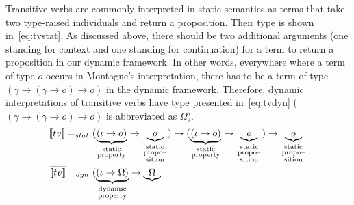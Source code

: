 Transitive verbs are commonly interpreted in static semantics as terms that take two type-raised individuals and return a proposition. Their type is shown in~\eqref{eq:tvstat}. As discussed above, there should be two additional arguments (one standing for context and one standing for continuation) for a term to return a proposition in our dynamic framework. In other words, everywhere where a term of type $o$ occurs in Montague's interpretation, there has to be a term of type $(\gamma \rightarrow (\gamma \rightarrow o) \rightarrow o)$ in the dynamic framework. 
Therefore, dynamic interpretations of transitive verbs have type presented in~\eqref{eq:tvdyn} ($(\gamma \rightarrow (\gamma \rightarrow o) \rightarrow o)$ is abbreviated as $\Omega$).
\begin{subequations}
\begin{align}
\I{tv} =_{stat} \ & (\underbrace{(\iota \rightarrow   o)}_{
\begin{smallmatrix}
\text{static}\\
\text{property}
\end{smallmatrix}} \rightarrow \underbrace{o}_{
\begin{smallmatrix}
\text{static}\\
\text{propo--}\\
\text{sition}
\end{smallmatrix}}) \rightarrow (\underbrace{(\iota \rightarrow   o)}_{
\begin{smallmatrix}
\text{static}\\
\text{property}
\end{smallmatrix}} \rightarrow \underbrace{o}_{
\begin{smallmatrix}
\text{static}\\
\text{propo--}\\
\text{sition}
\end{smallmatrix}})  \rightarrow \underbrace{o}_{
\begin{smallmatrix}
\text{static}\\
\text{propo--}\\
\text{sition}
\end{smallmatrix}} \label{eq:tvstat} \\
\tr{\I{tv}} =_{dyn} \ &  (\underbrace{(\iota \rightarrow   \Omega)}_{
\begin{smallmatrix}
\text{dynamic}\\
\text{property}
\end{smallmatrix}} \rightarrow \underbrace{\Omega}_{
\begin{smallmatrix}

\end{smallmatrix}}
\end{align}
\end{subequations}
